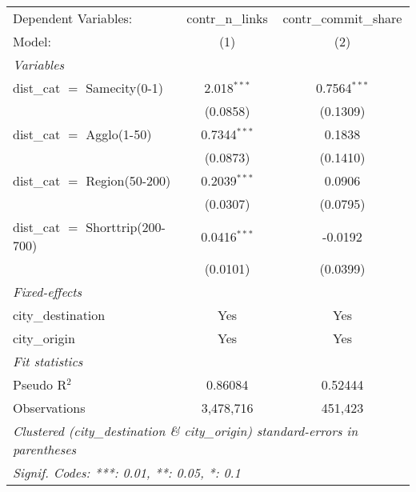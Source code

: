 
\begingroup
\centering
\begin{tabular}{lcc}
   \tabularnewline \midrule \midrule
   Dependent Variables:              & contr\_n\_links   & contr\_commit\_share\\    
   Model:                            & (1)               & (2)\\  
   \midrule
   \emph{Variables}\\
   dist\_cat $=$ Samecity(0-1)       & 2.018$^{***}$     & 0.7564$^{***}$\\   
                                     & (0.0858)          & (0.1309)\\   
   dist\_cat $=$ Agglo(1-50)         & 0.7344$^{***}$    & 0.1838\\   
                                     & (0.0873)          & (0.1410)\\   
   dist\_cat $=$ Region(50-200)      & 0.2039$^{***}$    & 0.0906\\   
                                     & (0.0307)          & (0.0795)\\   
   dist\_cat $=$ Shorttrip(200-700)  & 0.0416$^{***}$    & -0.0192\\   
                                     & (0.0101)          & (0.0399)\\   
   \midrule
   \emph{Fixed-effects}\\
   city\_destination                 & Yes               & Yes\\  
   city\_origin                      & Yes               & Yes\\  
   \midrule
   \emph{Fit statistics}\\
   Pseudo R$^2$                      & 0.86084           & 0.52444\\  
   Observations                      & 3,478,716         & 451,423\\  
   \midrule \midrule
   \multicolumn{3}{l}{\emph{Clustered (city\_destination \& city\_origin) standard-errors in parentheses}}\\
   \multicolumn{3}{l}{\emph{Signif. Codes: ***: 0.01, **: 0.05, *: 0.1}}\\
\end{tabular}
\par\endgroup


